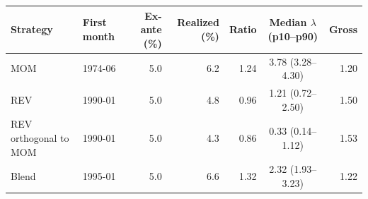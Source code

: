 \begin{tabular}{llrrrcr}
\toprule
Strategy & First month & Ex-ante (\%) & Realized (\%) & Ratio & Median $\lambda$ (p10--p90) & Gross \\
\midrule
MOM & 1974-06 & 5.0 & 6.2 & 1.24 & 3.78 (3.28--4.30) & 1.20 \\
REV & 1990-01 & 5.0 & 4.8 & 0.96 & 1.21 (0.72--2.50) & 1.50 \\
REV orthogonal to MOM & 1990-01 & 5.0 & 4.3 & 0.86 & 0.33 (0.14--1.12) & 1.53 \\
Blend & 1995-01 & 5.0 & 6.6 & 1.32 & 2.32 (1.93--3.23) & 1.22 \\
\bottomrule
\end{tabular}
